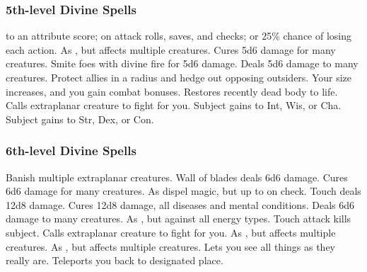 \subsubsection{5th-level Divine Spells}
\begin{spelllist}
    to an attribute score;  on attack rolls, saves, and checks; or 25\% chance of losing each action.
   As , but affects multiple creatures.
   Cures 5d6 damage for many creatures.
   Smite foes with divine fire for 5d6 damage.
   Deals 5d6 damage to many creatures.
   Protect allies in a \areamed radius and hedge out opposing outsiders.
   Your size increases, and you gain combat bonuses.
   Restores recently dead body to life.
   Calls extraplanar creature to fight for you.
   Subject gains  to Int, Wis, or Cha.
   Subject gains  to Str, Dex, or Con.
\end{spelllist}

\subsubsection{6th-level Divine Spells}
\begin{spelllist}
   Banish multiple extraplanar creatures. 
   Wall of blades deals 6d6 damage.
   Cures 6d6 damage for many creatures.
   As dispel magic, but up to  on check.
   Touch deals 12d8 damage.
   Cures 12d8 damage, all diseases and mental conditions.
   Deals 6d6 damage to many creatures.
   As , but against all energy types.
   Touch attack kills subject.
   Calls extraplanar creature to fight for you.
   As , but affects multiple creatures.
   As , but affects multiple creatures.
  \M Lets you see all things as they really are.
   Teleports you back to designated place.
\end{spelllist}

